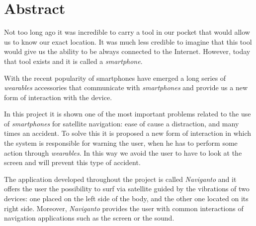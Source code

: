 \chapter{Abstract}

Not too long ago it was incredible to carry a tool in our pocket that would allow us to know our
exact location. It was much less credible to imagine that this tool would give us the ability to be
always connected to the Internet. However, today that tool exists and it is called a
\emph{smartphone}.

With the recent popularity of smartphones have emerged a long series of \emph{wearables} accessories
that communicate with \emph{smartphones} and provide us a new form of interaction with the device.

In this project it is shown one of the most important problems related to the use of
\emph{smartphones} for satellite navigation: ease of cause a distraction, and many times an
accident. To solve this it is proposed a new form of interaction in which the system is responsible
for warning the user, when he has to perform some action through \emph{wearables}. In this way we
avoid the user to have to look at the screen and will prevent this type of accident.

The application developed throughout the project is called \emph{Naviganto} and it offers the user
the possibility to surf via satellite guided by the vibrations of two devices: one placed on the
left side of the body, and the other one located on its right side. Moreover, \emph{Naviganto}
provides the user with common interactions of navigation applications such as the screen or the
sound.

